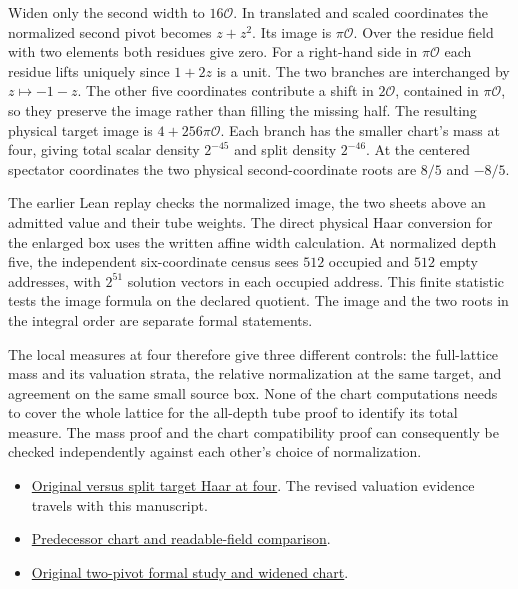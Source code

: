\documentclass[12pt,letterpaper]{article}
\begin{document}
Widen only the second width to \(16\mathcal O\). In translated and scaled coordinates the normalized second pivot becomes \(z+z^2\). Its image is \(\pi\mathcal O\). Over the residue field with two elements both residues give zero. For a right-hand side in \(\pi\mathcal O\) each residue lifts uniquely since \(1+2z\) is a unit. The two branches are interchanged by \(z\mapsto-1-z\). The other five coordinates contribute a shift in \(2\mathcal O\), contained in \(\pi\mathcal O\), so they preserve the image rather than filling the missing half. The resulting physical target image is \(4+256\pi\mathcal O\). Each branch has the smaller chart's mass at four, giving total scalar density \(2^{-45}\) and split density \(2^{-46}\). At the centered spectator coordinates the two physical second-coordinate roots are \(8/5\) and \(-8/5\).

The earlier Lean replay checks the normalized image, the two sheets above an admitted value and their tube weights. The direct physical Haar conversion for the enlarged box uses the written affine width calculation. At normalized depth five, the independent six-coordinate census sees \(512\) occupied and \(512\) empty addresses, with \(2^{51}\) solution vectors in each occupied address. This finite statistic tests the image formula on the declared quotient. The image and the two roots in the integral order are separate formal statements.

The local measures at four therefore give three different controls: the full-lattice mass and its valuation strata, the relative normalization at the same target, and agreement on the same small source box. None of the chart computations needs to cover the whole lattice for the all-depth tube proof to identify its total measure. The mass proof and the chart compatibility proof can consequently be checked independently against each other's choice of normalization.

\begin{itemize}
\item \href{https://github.com/nousentllc/riemann-hypothesis/tree/4be022986be0e29b4d38f9d04b17956131fe4d56/research/uriel/experiments/target-four-haar}{Original versus split target Haar at four}. The revised valuation evidence travels with this manuscript.
\item \href{https://github.com/nousentllc/riemann-hypothesis/tree/d69e65e6ac84b552fd7b0f112570904abe2ebdb1/research/uriel/experiments/target-four-regular-chart}{Predecessor chart and readable-field comparison}.
\item \href{https://github.com/nousentllc/riemann-hypothesis/tree/a4cdffe5be81baa134fc9c82219481e0070fc09c/research/uriel/experiments/target-four-chart-overlap}{Original two-pivot formal study and widened chart}.
\end{itemize}
\end{document}
